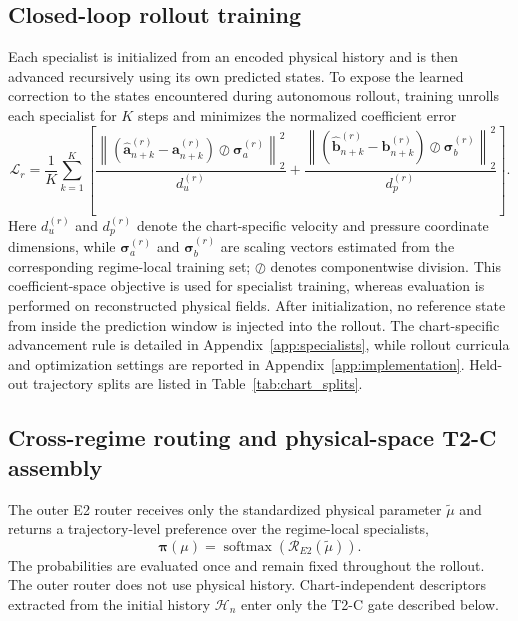 \documentclass{article}
\begin{document}
\subsection{Closed-loop rollout training}

Each specialist is initialized from an encoded physical history and is then advanced recursively using its own predicted states. To expose the learned correction to the states encountered during autonomous rollout, training unrolls each specialist for $K$ steps and minimizes the
normalized coefficient error
\begin{equation}
  \mathcal L_r=\frac{1}{K}\sum_{k=1}^{K}\left[
  \frac{\left\|(\widehat{\bm a}_{n+k}^{(r)}-\bm a_{n+k}^{(r)})
  \oslash\bm\sigma_a^{(r)}\right\|_2^2}{d_u^{(r)}}
  +\frac{\left\|(\widehat{\bm b}_{n+k}^{(r)}-\bm b_{n+k}^{(r)})
  \oslash\bm\sigma_b^{(r)}\right\|_2^2}{d_p^{(r)}}\right].
  \label{eq:main_rollout_loss}
\end{equation}
Here $d_u^{(r)}$ and $d_p^{(r)}$ denote the chart-specific velocity and pressure coordinate dimensions, while $\bm\sigma_a^{(r)}$ and $\bm\sigma_b^{(r)}$ are scaling
vectors estimated from the corresponding regime-local training set; $\oslash$ denotes componentwise division. This coefficient-space objective is used for specialist training, whereas evaluation is performed on reconstructed physical fields. After initialization, no reference state from inside the prediction window is injected into the rollout. The chart-specific advancement rule is detailed in Appendix~\ref{app:specialists}, while rollout curricula and optimization settings are reported in Appendix~\ref{app:implementation}. Held-out trajectory splits are listed in Table~\ref{tab:chart_splits}.



\subsection{Cross-regime routing and physical-space T2-C assembly}

The outer E2 router receives only the standardized physical parameter $\widetilde\mu$ and returns a trajectory-level preference over the
regime-local specialists,
\[
\bm\pi(\mu)
=
\operatorname{softmax}\!\left(
\mathcal R_{E2}(\widetilde\mu)
\right).
\]
The probabilities are evaluated once and remain fixed throughout the rollout. The outer router does not use physical history. Chart-independent descriptors extracted from the initial history $\mathcal H_n$ enter only the T2-C gate described below.
\end{document}
